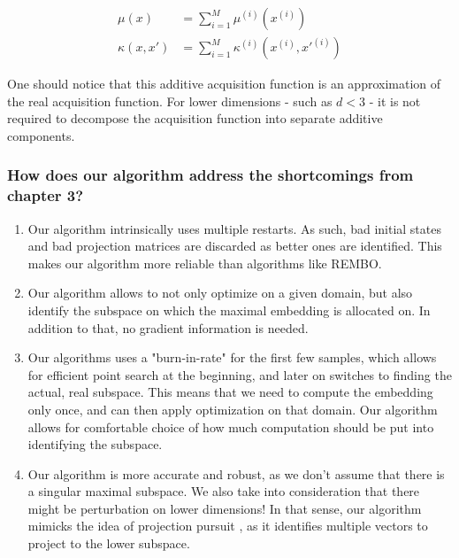 
\begin{align}
\mu(x) &= \sum_{i=1}^{M} \mu^{(i)} ( x^{(i)} ) \\
\kappa(x, x') &= \sum_{i=1}^{M} \kappa^{(i)} ( x^{(i)}, x'^{(i)}  )
\end{align}

One should notice that this additive acquisition function is an approximation of the real acquisition function. 
For lower dimensions - such as $d<3$ - it is not required to decompose the acquisition function into separate additive components.

\subsubsection{How does our algorithm address the shortcomings from chapter 3?}

\begin{enumerate}
\item Our algorithm intrinsically uses multiple restarts.
As such, bad initial states and bad projection matrices are discarded as better ones are identified.
This makes our algorithm more reliable than algorithms like REMBO.
\item Our algorithm allows to not only optimize on a given domain, but also identify the subspace on which the maximal embedding is allocated on.
In addition to that, no gradient information is needed.
\item Our algorithms uses a "burn-in-rate" for the first few samples, which allows for efficient point search at the beginning, and later on switches to finding the actual, real subspace.
This means that we need to compute the embedding only once, and can then apply optimization on that domain.
Our algorithm allows for comfortable choice of how much computation should be put into identifying the subspace.
\item Our algorithm is more accurate and robust, as we don't assume that there is a singular maximal subspace. 
We also take into consideration that there might be perturbation on lower dimensions!
In that sense, our algorithm mimicks the idea of projection pursuit \citep{ProjectionPursuit}, as it identifies multiple vectors to project to the lower subspace.
\end{enumerate}


